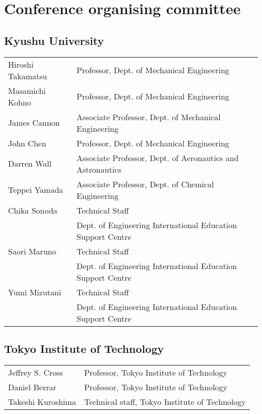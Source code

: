 \section{Conference organising committee}

\subsection*{Kyushu University}
    \begin{tabular}{ll}
        Hiroshi Takamatsu & Professor, Dept. of Mechanical Engineering \\
        Masamichi Kohno & Professor, Dept. of Mechanical Engineering \\
        James Cannon    & Associate Professor, Dept. of Mechanical Engineering \\
        John Chen       & Professor, Dept. of Mechanical Engineering \\
        Darren Wall     & Associate Professor,  Dept. of Aeronautics and Astronautics \\
        Teppei Yamada   & Associate Professor, Dept. of Chemical Engineering \\
        Chika Sonoda    & Technical Staff \\ 
                        & Dept. of Engineering International Education Support Centre \\
        Saori Maruno    & Technical Staff\\
                        & Dept. of Engineering International Education Support Centre \\
        Yumi Mizutani   & Technical Staff\\
                        & Dept. of Engineering International Education Support Centre \\
    \end{tabular}

\subsection*{Tokyo Institute of Technology}

    \begin{tabular}{ll}
        Jeffrey S. Cross & Professor, Tokyo Institute of Technology \\
        Daniel Berrar & Professor, Tokyo Institute of Technology \\
        Takeshi Kuroshima & Technical staff, Tokyo Institute of Technology \\
    \end{tabular}
